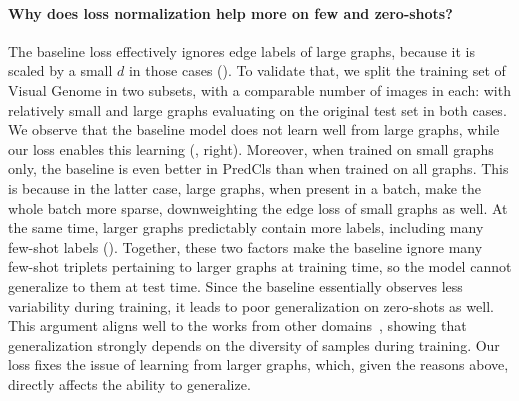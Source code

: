 	

\paragraph{Why does loss normalization help more on few and zero-shots?}
The baseline loss effectively ignores edge labels of large graphs, because it is scaled by a small $d$ in those cases (\fig{\ref{fig:graph_density}}). To validate that, we split the training set of Visual Genome in two subsets, with a comparable number of images in each: with relatively small and large graphs evaluating on the original test set in both cases. We observe that the baseline model does not learn well from large graphs, while our loss enables this learning (\fig{\ref{fig:freq}}, right). Moreover, when trained on small graphs only, the baseline is even better in PredCls than when trained on all graphs. This is because in the latter case, large graphs, when present in a batch, make the whole batch more sparse, downweighting the edge loss of small graphs as well. 
At the same time, larger graphs predictably contain more labels, including many few-shot labels (\fig{\ref{fig:motivation}}). %
Together, these two factors make the baseline ignore many few-shot triplets pertaining to larger graphs at training time, so the model cannot generalize to them at test time.
Since the baseline essentially observes less variability during training, it leads to poor generalization on zero-shots as well. This argument aligns well to the works from other domains~\citep{hill2019environmental}, showing that generalization strongly depends on the diversity of samples during training.
Our loss fixes the issue of learning from larger graphs, which, given the reasons above, directly affects the ability to generalize.


